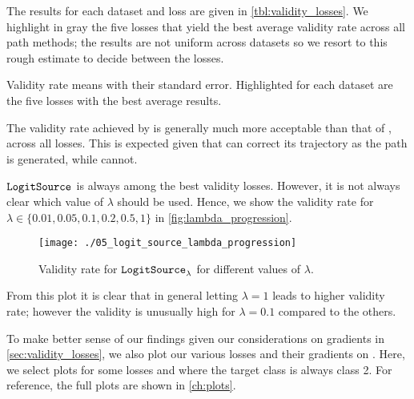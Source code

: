 \documentclass[../main.tex]{subfiles}
\begin{document}
The results for each dataset and loss are given in \autoref{tbl:validity_losses}.
We highlight in gray the five losses that yield the best average validity rate across all path methods; the results are not uniform across datasets so we resort to this rough estimate to decide between the losses.

\begin{table}[H]
    \centering
    
    \caption{Validity rate means with their standard error. Highlighted for each dataset are the five losses with the best average results.}
    \label{tbl:validity_losses}
\end{table}



The validity rate achieved by \revise{} is generally much more acceptable than that of \ls{}, across all losses.
This is expected given that \revise{} can correct its trajectory as the path is generated, while \ls{} cannot.

$\mathtt{LogitSource}_{}$ is always among the best validity losses.
However, it is not always clear which value of $\lambda$ should be used.
Hence, we show the validity rate for $\lambda \in \{ 0.01, 0.05, 0.1, 0.2, 0.5, 1\}$ in \autoref{fig:lambda_progression}.

\begin{figure}[htbp]
    \centering
\texttt{[image: ./05\_logit\_source\_lambda\_progression]}

    \caption{Validity rate for $\mathtt{LogitSource}_{\lambda}$ for different values of $\lambda$.}
    \label{fig:lambda_progression}
\end{figure}

From this plot it is clear that in general letting $\lambda = 1$ leads to higher validity rate;
however the validity is unusually high for $\lambda = 0.1$ compared to the others.

To make better sense of our findings given our considerations on gradients in \autoref{sec:validity_losses},
we also plot our various losses and their gradients on \CakeOnSea.
Here, we select plots for some losses and where the target class is always class 2.
For reference, the full plots are shown in \autoref{ch:plots}.


\end{document}
